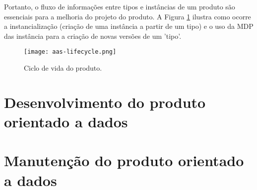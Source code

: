 	Portanto, o fluxo de informações entre tipos e instâncias de um produto são essenciais para a melhoria do projeto do produto. A Figura \ref{fig:aas-lifecycle} ilustra como ocorre a instancialização (criação de uma instância a partir de um tipo) e o uso da MDP das instância para a criação de novas versões de um 'tipo'.
	
	\begin{figure}[hbt!]
	  \centering
	  \caption{Ciclo de vida do produto.}
	  \texttt{[image: aas-lifecycle.png]}
	  \label{fig:aas-lifecycle}
	\end{figure}


\section{Desenvolvimento do produto orientado a dados}

\lipsum[1-1]

\section{Manutenção do produto orientado a dados}

\lipsum[1-1]